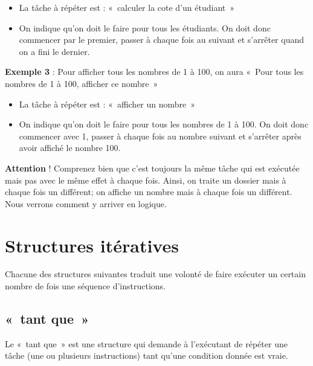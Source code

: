 	\begin{itemize}
	\item 
		La tâche à répéter est : «~calculer la cote d'un
		étudiant~»
	\item 
		On indique qu'on doit le faire pour tous les étudiants.
		On doit donc commencer par le premier, passer à chaque fois au suivant
		et s'arrêter quand on a fini le dernier.
	\end{itemize}

	\textbf{Exemple 3} : Pour afficher tous les nombres de 1 à 100, on aura
	«~Pour tous les nombres de 1 à 100, afficher ce nombre~»

	\begin{itemize}
	\item
		La tâche à répéter est : «~afficher un nombre~»
	\item 
		On indique qu'on doit le faire pour tous les nombres de
		1 à 100. On doit donc commencer avec 1, passer à chaque fois au nombre
		suivant et s'arrêter après avoir affiché le nombre
		100.
	\end{itemize}

	\textbf{Attention} ! Comprenez bien que c'est toujours
	la même tâche qui est exécutée mais pas avec le même effet à chaque
	fois. Ainsi, on traite un dossier mais à chaque fois un différent; on
	affiche un nombre mais à chaque fois un différent. Nous verrons comment
	y arriver en logique.

\section{Structures itératives}

	Chacune des structures suivantes traduit une volonté de faire exécuter
	un certain nombre de fois une séquence d’instructions. 

	\subsection{«~tant que~»}

		Le «~tant que~» est une structure qui demande à
		l'exécutant de répéter une tâche (une ou plusieurs
		instructions) tant qu'une condition donnée est vraie.


